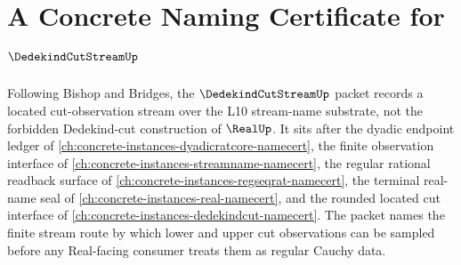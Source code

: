 \chapter{A Concrete Naming Certificate for $\DedekindCutStreamUp$}
\label{ch:concrete-instances-dedekind-cut-stream-namecert}

Following Bishop and Bridges, the $\DedekindCutStreamUp$ packet records a located cut-observation stream over the L10 stream-name substrate, not the forbidden Dedekind-cut construction of $\RealUp$. It sits after the dyadic endpoint ledger of \autoref{ch:concrete-instances-dyadicratcore-namecert}, the finite observation interface of \autoref{ch:concrete-instances-streamname-namecert}, the regular rational readback surface of \autoref{ch:concrete-instances-regseqrat-namecert}, the terminal real-name seal of \autoref{ch:concrete-instances-real-namecert}, and the rounded located cut interface of \autoref{ch:concrete-instances-dedekindcut-namecert}. The packet names the finite stream route by which lower and upper cut observations can be sampled before any Real-facing consumer treats them as regular Cauchy data.

